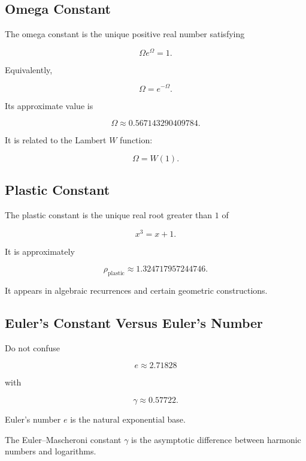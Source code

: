 \subsection{Omega Constant}
\label{subsec:omega-constant-reference}

The omega constant is the unique positive real number satisfying

\[
\boxed{
\Omega e^\Omega=1.
}
\]

Equivalently,

\[
\boxed{
\Omega
=
e^{-\Omega}.
}
\]

Its approximate value is

\[
\boxed{
\Omega
\approx
0.567143290409784.
}
\]

It is related to the Lambert \(W\) function:

\[
\boxed{
\Omega
=
W(1).
}
\]

\subsection{Plastic Constant}
\label{subsec:plastic-constant-reference}

The plastic constant is the unique real root greater than \(1\) of

\[
\boxed{
x^3=x+1.
}
\]

It is approximately

\[
\boxed{
\rho_{\mathrm{plastic}}
\approx
1.324717957244746.
}
\]

It appears in algebraic recurrences and certain geometric constructions.

\subsection{Euler's Constant Versus Euler's Number}
\label{subsec:euler-constant-versus-number}

Do not confuse

\[
\boxed{
e
\approx
2.71828
}
\]

with

\[
\boxed{
\gamma
\approx
0.57722.
}
\]

Euler's number \(e\) is the natural exponential base.

The Euler--Mascheroni constant \(\gamma\) is the asymptotic difference between
harmonic numbers and logarithms.

